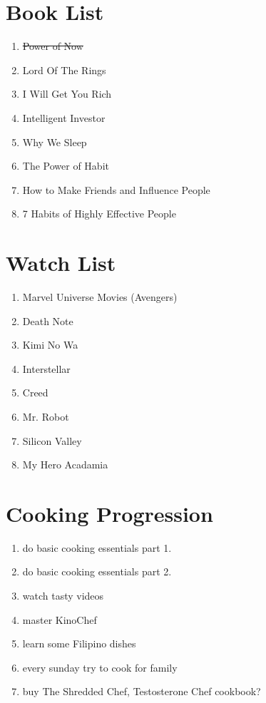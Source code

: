 \documentclass[10pt]{article}
\begin{document}
\section*{Book List}
\begin{enumerate}
    \item \sout{Power of Now}
    \item Lord Of The Rings
    \item I Will Get You Rich
    \item Intelligent Investor
    \item Why We Sleep
    \item The Power of Habit
    \item How to Make Friends and Influence People
    \item 7 Habits of Highly Effective People
\end{enumerate}

\section*{Watch List}
\begin{enumerate}
    \item Marvel Universe Movies (Avengers)
    \item Death Note
    \item Kimi No Wa
    \item Interstellar
    \item Creed
    \item Mr. Robot
    \item Silicon Valley
    \item My Hero Acadamia
\end{enumerate}

\section*{Cooking Progression}
\begin{enumerate}
    \item do basic cooking essentials part 1.
    \item do basic cooking essentials part 2.
    \item watch tasty videos
    \item master KinoChef
    \item learn some Filipino dishes
    \item every sunday try to cook for family
    \item buy The Shredded Chef, Testosterone Chef cookbook?
\end{enumerate}
\end{document}
